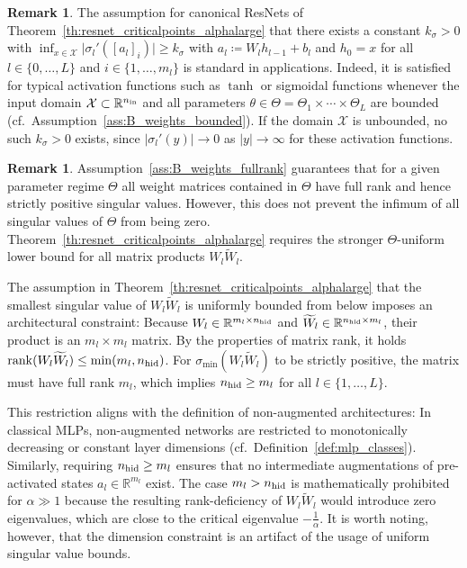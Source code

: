 \documentclass[10pt]{article}
\theoremstyle{definition}
\newtheorem{remark}[theorem]{Remark}
\numberwithin{equation}{section}
\newcommand{\eps}{\varepsilon}
\newcommand{\R}{\mathbb{R}}
\newcommand*{\nhid}{n_\textup{hid}}
\newcommand*{\nin}{n_\textup{in}}
\begin{document}
\begin{remark}
    The assumption for canonical ResNets of Theorem~\ref{th:resnet_criticalpoints_alphalarge} that there exists a constant $k_\sigma >0$ with $\inf_{x \in \mathcal{X}} \vert \sigma_l'([a_l]_i)\vert \geq k_\sigma$ with $a_l \coloneqq W_l h_{l-1} + b_l$ and $h_0 = x$ for all $l \in \{0,\ldots,L\}$ and $i\in\{1,\ldots,m_l\}$ is standard in applications. Indeed, it is satisfied for typical activation functions such as $\tanh$ or sigmoidal functions whenever the input domain $\mathcal{X}\subset \R^{\nin}$ and all parameters $\theta \in \Theta = \Theta_1 \times \cdots \times \Theta_L$ are bounded (cf.~Assumption~\ref{ass:B_weights_bounded}). If the domain $\mathcal{X}$ is unbounded, no such $k_\sigma > 0$ exists, since $\vert \sigma_l'(y)\vert \to 0$ as $\vert y \vert \to \infty$ for these activation functions.
\end{remark}

\begin{remark}
    Assumption~\ref{ass:B_weights_fullrank} guarantees that for a given parameter regime $\Theta$ all weight matrices contained in $\Theta$ have full rank and hence strictly positive singular values. However, this does not prevent the infimum of all singular values of $\Theta$ from being zero. Theorem~\ref{th:resnet_criticalpoints_alphalarge} requires the stronger $\Theta$-uniform lower bound for all matrix products $W_l \widetilde{W}_{l}$.
    
    The assumption in Theorem~\ref{th:resnet_criticalpoints_alphalarge} that the smallest singular value of $W_l \widetilde{W}_l$ is uniformly bounded from below imposes an architectural constraint: Because $W_l \in \R^{m_l \times \nhid}$ and $\widetilde{W}_l \in \R^{\nhid \times m_l}$, their product is an $m_l \times m_l$ matrix. By the properties of matrix rank, it holds $\operatorname{rank}(W_l \widetilde{W}_l) \leq \min(m_l, \nhid)$. For $\sigma_{\min}(W_l \widetilde{W}_l)$ to be strictly positive, the matrix must have full rank $m_l$, which implies $\nhid \geq m_l$ for all $l \in \{1,\ldots,L\}$.
    
    This restriction aligns with the definition of non-augmented architectures: In classical MLPs, non-augmented networks are restricted to monotonically decreasing or constant layer dimensions (cf.~Definition~\ref{def:mlp_classes}). Similarly, requiring $\nhid \geq m_l$ ensures that no intermediate augmentations of pre-activated states $a_l \in \R^{m_l}$ exist. The case $m_l> \nhid$ is mathematically prohibited for $\alpha \gg 1$ because the resulting rank-deficiency of $W_l \widetilde{W}_l$ would introduce zero eigenvalues, which are close to the critical eigenvalue $-\frac{1}{\alpha}$. It is worth noting, however, that the dimension constraint is an artifact of the usage of uniform singular value bounds.
\end{remark}
\end{document}
